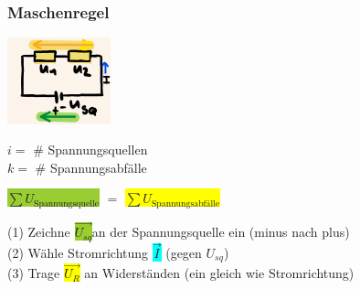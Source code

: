     \subsubsection*{Maschenregel}
    \vspace{-1mm}
    \begin{minipage}{0.49\linewidth}
        \begin{footnotesize}
            \begin{center}
                \vspace{2mm}
                \includegraphics[width = 30mm]{src/images/maschenregel.png}
            \end{center}
        \end{footnotesize}
    \end{minipage}
    \begin{minipage}{0.5\linewidth}
        \begin{scriptsize}
            \begin{center}
                $i =$ \# Spannungsquellen\\
                $k =$ \# Spannungsabfälle
            \end{center}
        \end{scriptsize}
    \end{minipage}
    \vspace{1mm}
    \hfill \colorbox{YellowGreen}{$\sum U_\text{Spannungsquelle}$} $=$ \colorbox{Yellow}{$\sum U_\text{Spannungsabfälle}$} 

    (1) Zeichne \colorbox{YellowGreen}{$\overrightarrow{U_{sq}}$}an der Spannungsquelle ein (minus nach plus)
    \\(2) Wähle Stromrichtung \colorbox{Cyan}{$\overrightarrow{I}$} (gegen $U_{sq}$)
    \\(3) Trage \colorbox{Yellow}{$\overrightarrow{U_R}$} an Widerständen (ein gleich wie Stromrichtung)